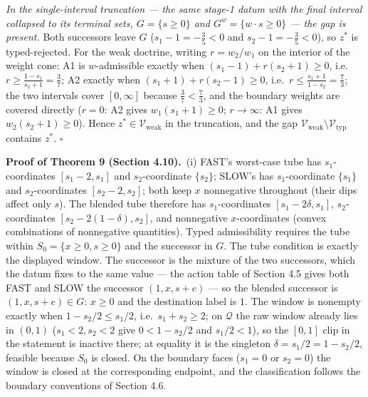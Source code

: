\documentclass[3p,11pt]{elsarticle}
\begin{document}
\emph{In the single-interval truncation --- the same stage-1 datum with
the final interval collapsed to its terminal sets, \(G = \{s \ge 0\}\)
and \(G^w = \{w \cdot s \ge 0\}\) --- the gap is present.} Both
successors leave \(G\) (\(s_1 - 1 = -\tfrac35 < 0\) and
\(s_2 - 1 = -\tfrac35 < 0\)), so \(z^*\) is typed-rejected. For the weak
doctrine, writing \(r = w_2 / w_1\) on the interior of the weight cone:
A1 is \(w\)-admissible exactly when \((s_1 - 1) + r (s_2 + 1) \ge 0\),
i.e.~\(r \ge \tfrac{1 - s_1}{s_2 + 1} = \tfrac37\); A2 exactly when
\((s_1 + 1) + r (s_2 - 1) \ge 0\),
i.e.~\(r \le \tfrac{s_1 + 1}{1 - s_2} = \tfrac73\); the two intervals
cover \([0, \infty]\) because \(\tfrac37 < \tfrac73\), and the boundary
weights are covered directly (\(r = 0\): A2 gives
\(w_1(s_1 + 1) \ge 0\); \(r \to \infty\): A1 gives
\(w_2(s_2 + 1) \ge 0\)). Hence \(z^* \in \mathcal{V}_{\mathrm{weak}}\)
in the truncation, and the gap
\(\mathcal{V}_{\mathrm{weak}} \setminus \mathcal{V}_{\mathrm{typ}}\)
contains \(z^*\). \ensuremath{\square}

\textbf{Proof of Theorem 9 (Section 4.10).}\ (i) FAST's worst-case tube has \(s_1\)-coordinates
\([s_1 - 2, s_1]\) and \(s_2\)-coordinate \(\{s_2\}\); SLOW's has
\(s_1\)-coordinate \(\{s_1\}\) and \(s_2\)-coordinates
\([s_2 - 2, s_2]\); both keep \(x\) nonnegative throughout (their dips
affect only \(s\)). The blended tube therefore has \(s_1\)-coordinates
\([s_1 - 2\delta, s_1]\), \(s_2\)-coordinates
\([s_2 - 2(1-\delta), s_2]\), and nonnegative \(x\)-coordinates (convex
combinations of nonnegative quantities). Typed admissibility requires
the tube within \(S_0 = \{x \ge 0, s \ge 0\}\) and the successor in
\(G\). The tube condition is exactly the displayed window. The successor
is the mixture of the two successors, which the datum fixes to the same
value --- the action table of Section 4.5 gives both FAST and SLOW the
successor \((1, x, s + e)\) --- so the blended successor is
\((1, x, s + e) \in G\): \(x \ge 0\) and the destination label is \(1\).
The window is nonempty exactly when \(1 - s_2/2 \le s_1/2\),
i.e.~\(s_1 + s_2 \ge 2\); on \(\mathcal{Q}\) the raw window already
lies in \((0,1)\) (\(s_1 < 2, s_2 < 2\) give \(0 < 1 - s_2/2\) and
\(s_1/2 < 1\)), so the \([0,1]\) clip in the statement is inactive
there; at equality it is the singleton
\(\delta = s_1/2 = 1 - s_2/2\), feasible because \(S_0\) is closed. On
the boundary faces (\(s_1 = 0\) or \(s_2 = 0\)) the window is closed at
the corresponding endpoint, and the classification follows the boundary
conventions of Section 4.6.
\end{document}
